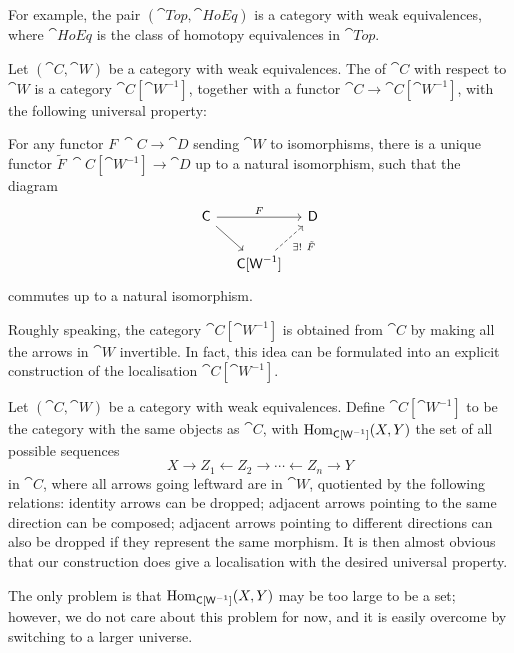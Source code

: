 For example, the pair $(\cat{Top},\cat{HoEq})$ is a category with weak equivalences,
where $\cat{HoEq}$ is the class of homotopy equivalences in $\cat{Top}$.

\begin{definition}
    Let $(\cat C,\cat W)$ be a category with weak equivalences.
    The  of $\cat C$ with respect to $\cat W$
    is a category $\cat C[\cat W^{-1}]$,
    together with a functor $\cat C\to\cat C[\cat W^{-1}]$,
    with the following universal property:
    \begin{itms}
        \item For any functor $F\:\cat C\to\cat D$ sending $\cat W$ to isomorphisms,
        there is a unique functor $\tilde F\:\cat C[\cat W^{-1}]\to\cat D$ up to a natural isomorphism,
        such that the diagram
        \[ \begin{tikzcd}[column sep=10pt]
            \cat C\ar[rr,"F"]\ar[dr] & & \cat D\\
            & \cat C[\cat W^{-1}]\ar[ur,dashed,"\exists!\ \tilde F"']
        \end{tikzcd} \]
        commutes up to a natural isomorphism.
    \end{itms}
\end{definition}

Roughly speaking, the category $\cat C[\cat W^{-1}]$
is obtained from $\cat C$ by making all the arrows in $\cat W$ invertible.
In fact, this idea can be formulated into an explicit construction
of the localisation $\cat C[\cat W^{-1}]$.

\begin{construction} \label{constr-1-locn}
    Let $(\cat C,\cat W)$ be a category with weak equivalences.
    Define $\cat C[\cat W^{-1}]$ to be the category with the same objects as $\cat C$,
    with $\operatorname{Hom}_{\textup{\textsf{C}}[\textup{\textsf{W}}^{-1}]}(X,Y)$
    the set of all possible sequences
    \[ X\to Z_1\gets Z_2\to\cdots \gets Z_n\to Y \]
    in $\cat C$,
    where all arrows going leftward are in $\cat W$,
    quotiented by the following relations:
    identity arrows can be dropped;
    adjacent arrows pointing to the same direction can be composed;
    adjacent arrows pointing to different directions can also be dropped
    if they represent the same morphism.
    It is then almost obvious that
    our construction does give a localisation with the desired universal property.

    The only problem is that $\operatorname{Hom}_{\textup{\textsf{C}}[\textup{\textsf{W}}^{-1}]}(X,Y)$
    may be too large to be a set; 
    however, we do not care about this problem for now, 
    and it is easily overcome by switching to a larger universe. \varqed
\end{construction}


